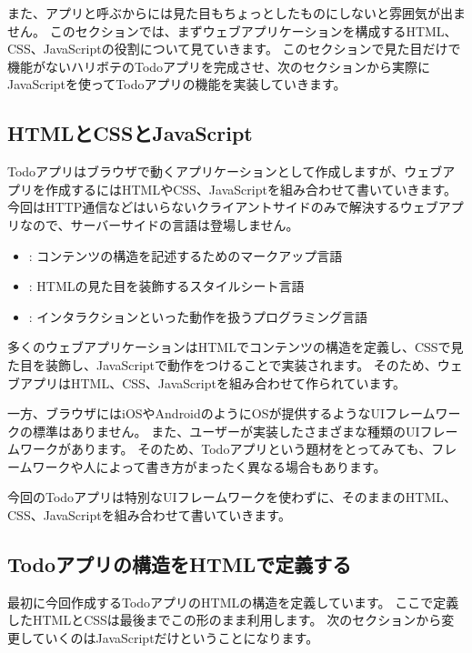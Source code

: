 また、アプリと呼ぶからには見た目もちょっとしたものにしないと雰囲気が出ません。
このセクションでは、まずウェブアプリケーションを構成するHTML、CSS、JavaScriptの役割について見ていきます。
このセクションで見た目だけで機能がないハリボテのTodoアプリを完成させ、次のセクションから実際にJavaScriptを使ってTodoアプリの機能を実装していきます。

\hypertarget{html-css-javascript}{%
\subsection{HTMLとCSSとJavaScript}\label{html-css-javascript}}

Todoアプリはブラウザで動くアプリケーションとして作成しますが、ウェブアプリを作成するにはHTMLやCSS、JavaScriptを組み合わせて書いていきます。
今回はHTTP通信などはいらないクライアントサイドのみで解決するウェブアプリなので、サーバーサイドの言語は登場しません。

\begin{itemize}
\item
  : コンテンツの構造を記述するためのマークアップ言語
\item
  : HTMLの見た目を装飾するスタイルシート言語
\item
  : インタラクションといった動作を扱うプログラミング言語
\end{itemize}

多くのウェブアプリケーションはHTMLでコンテンツの構造を定義し、CSSで見た目を装飾し、JavaScriptで動作をつけることで実装されます。
そのため、ウェブアプリはHTML、CSS、JavaScriptを組み合わせて作られています。

一方、ブラウザにはiOSやAndroidのようにOSが提供するようなUIフレームワークの標準はありません。
また、ユーザーが実装したさまざまな種類のUIフレームワークがあります。
そのため、Todoアプリという題材をとってみても、フレームワークや人によって書き方がまったく異なる場合もあります。

今回のTodoアプリは特別なUIフレームワークを使わずに、そのままのHTML、CSS、JavaScriptを組み合わせて書いていきます。

\hypertarget{todo-html}{%
\subsection{Todoアプリの構造をHTMLで定義する}\label{todo-html}}

最初に今回作成するTodoアプリのHTMLの構造を定義しています。
ここで定義したHTMLとCSSは最後までこの形のまま利用します。
次のセクションから変更していくのはJavaScriptだけということになります。

